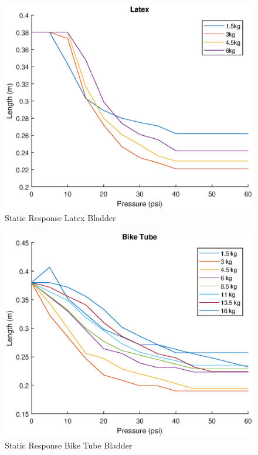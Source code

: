 \documentclass[11pt,a4paper]{article}
\begin{document}
\begin{figure}[!hbt]
    \centering
    \includegraphics[scale=0.8]{latex.eps}
    \caption{Static Response Latex Bladder}
    \label{fig:static_response_latex}
\end{figure}

\begin{figure}[!hbt]
    \centering
    \includegraphics[scale=0.8]{BikeTube.eps}
    \caption{Static Response Bike Tube Bladder}
    \label{fig:static_response_bike}
\end{figure}
\end{document}
